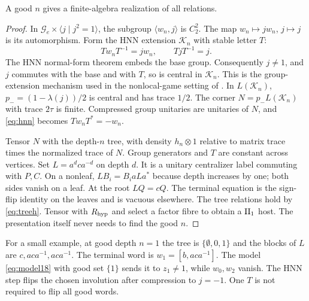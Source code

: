 \begin{lemma}\label{lem:hnn}
A good $n$ gives a finite-algebra realization of all relations.
\end{lemma}
\begin{proof}
In $\mathcal G_e\times\langle j\mid j^2=1\rangle$, the subgroup
$\langle w_n,j\rangle$ is $C_2^2$. The map
$w_n\mapsto jw_n$, $j\mapsto j$ is its automorphism.
Form the HNN extension $\mathcal K_n$ with stable letter $T$:
\begin{equation}\label{eq:hnn}
 Tw_nT^{-1}=jw_n,\qquad TjT^{-1}=j.
\end{equation}
The HNN normal-form theorem \cite{HNN} embeds the base group.
Consequently $j\ne1$, and $j$ commutes with the base and with $T$,
so is central in $\mathcal K_n$. This is the group-extension mechanism used
in the nonlocal-game setting of \cite{Slofstra}.
In $L(\mathcal K_n)$, $p_-=(1-\lambda(j))/2$ is central and has trace $1/2$.
The corner $N=p_-L(\mathcal K_n)$ with trace $2\tau$ is finite.
Compressed group unitaries are unitaries of $N$, and
\eqref{eq:hnn} becomes $Tw_nT^*=-w_n$.

Tensor $N$ with the depth-$n$ tree, with density $h_n\otimes1$
relative to matrix trace times the normalized trace of $N$.
Group generators and $T$ are constant across vertices.
Set $L=a^dca^{-d}$ on depth $d$.
It is a unitary centralizer label commuting with $P,C$.
On a nonleaf, $LB_i=B_i aLa^*$ because depth increases by one;
both sides vanish on a leaf. At the root $LQ=cQ$.
The terminal equation is the sign-flip identity on the leaves and
is vacuous elsewhere. The tree relations hold by \eqref{eq:treeh}.
Tensor with $R_{\rm hyp}$ and select a factor fibre to obtain a $\mathrm{II}_1$ host.
The presentation itself never needs to find the good $n$.
\end{proof}

For a small example, at good depth $n=1$ the tree is
$\{\emptyset,0,1\}$ and the blocks of $L$ are
$c,aca^{-1},aca^{-1}$. The terminal word is $w_1=[b,aca^{-1}]$.
The model \eqref{eq:model18} with good set $\{1\}$ sends it to
$z_1\ne1$, while $w_0,w_2$ vanish. The HNN step flips the chosen
involution after compression to $j=-1$. One $T$ is not required
to flip all good words.
